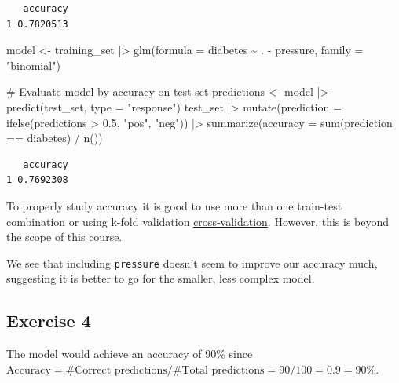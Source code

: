 \documentclass[
  letterpaper,
  DIV=11,
  numbers=noendperiod]{scrreprt}
\newenvironment{Shaded}{\begin{snugshade}}{\end{snugshade}}
\newcommand{\AttributeTok}[1]{\textcolor[rgb]{0.40,0.45,0.13}{#1}}
\newcommand{\CommentTok}[1]{\textcolor[rgb]{0.37,0.37,0.37}{#1}}
\newcommand{\FloatTok}[1]{\textcolor[rgb]{0.68,0.00,0.00}{#1}}
\newcommand{\FunctionTok}[1]{\textcolor[rgb]{0.28,0.35,0.67}{#1}}
\newcommand{\NormalTok}[1]{\textcolor[rgb]{0.00,0.23,0.31}{#1}}
\newcommand{\OtherTok}[1]{\textcolor[rgb]{0.00,0.23,0.31}{#1}}
\newcommand{\SpecialCharTok}[1]{\textcolor[rgb]{0.37,0.37,0.37}{#1}}
\newcommand{\StringTok}[1]{\textcolor[rgb]{0.13,0.47,0.30}{#1}}
\begin{document}
\begin{verbatim}
   accuracy
1 0.7820513
\end{verbatim}

\begin{Shaded}
\begin{Highlighting}[]
\NormalTok{model }\OtherTok{\textless{}{-}}\NormalTok{ training\_set }\SpecialCharTok{|\textgreater{}} 
  \FunctionTok{glm}\NormalTok{(}\AttributeTok{formula =}\NormalTok{ diabetes }\SpecialCharTok{\textasciitilde{}}\NormalTok{ . }\SpecialCharTok{{-}}\NormalTok{ pressure, }\AttributeTok{family =} \StringTok{"binomial"}\NormalTok{)}

\CommentTok{\# Evaluate model by accuracy on test set}
\NormalTok{predictions }\OtherTok{\textless{}{-}}\NormalTok{ model }\SpecialCharTok{|\textgreater{}} 
  \FunctionTok{predict}\NormalTok{(test\_set, }\AttributeTok{type =} \StringTok{"response"}\NormalTok{)}
\NormalTok{test\_set }\SpecialCharTok{|\textgreater{}} 
  \FunctionTok{mutate}\NormalTok{(}\AttributeTok{prediction =} \FunctionTok{ifelse}\NormalTok{(predictions }\SpecialCharTok{\textgreater{}} \FloatTok{0.5}\NormalTok{, }\StringTok{"pos"}\NormalTok{, }\StringTok{"neg"}\NormalTok{)) }\SpecialCharTok{|\textgreater{}} 
  \FunctionTok{summarize}\NormalTok{(}\AttributeTok{accuracy =} \FunctionTok{sum}\NormalTok{(prediction }\SpecialCharTok{==}\NormalTok{ diabetes) }\SpecialCharTok{/} \FunctionTok{n}\NormalTok{())}
\end{Highlighting}
\end{Shaded}

\begin{verbatim}
   accuracy
1 0.7692308
\end{verbatim}

To properly study accuracy it is good to use more than one train-test
combination or using k-fold validation
\href{'https://en.wikipedia.org/wiki/Cross-validation_(statistics)'}{cross-validation}.
However, this is beyond the scope of this course.

We see that including \texttt{pressure} doesn't seem to improve our
accuracy much, suggesting it is better to go for the smaller, less
complex model.

\subsection{Exercise 4}\label{exercise-4-14}

The model would achieve an accuracy of 90\% since
\(\text{Accuracy} = \#\text{Correct predictions} / \#\text{Total predictions} = 90 / 100 = 0.9 = 90 \%\).
\end{document}
